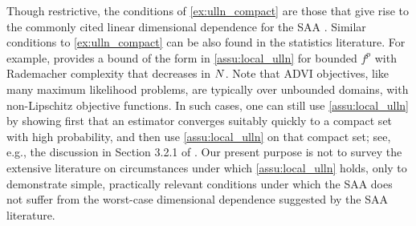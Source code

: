 %
Though restrictive, the conditions of \cref{ex:ulln_compact} are those that give
rise to the commonly cited linear dimensional dependence for the SAA
\citep[e.g.][]{nemirovski:2009:sgdvsfixed, kim:2015:guidetosaa,
homem:2014:montecarlosaa}. Similar conditions to \cref{ex:ulln_compact} can be
also found in the statistics literature.  For example, \citet[Theorem
4.10]{wainwright:2019:high} provides a bound of the form in
\cref{assu:local_ulln} for bounded $f^p$ with Rademacher complexity that
decreases in $N$.
%
Note that ADVI objectives, like many maximum likelihood problems, are typically
over unbounded domains, with non-Lipschitz objective functions.  In such cases,
one can still use \cref{assu:local_ulln} by showing first that an estimator
converges suitably quickly to a compact set with high probability, and then use
\cref{assu:local_ulln} on that compact set; see, e.g., the discussion in Section
3.2.1 of \citet{wellner:2013:empiricalprocesses}.
%
Our present purpose is not to survey the extensive literature on circumstances
under which \cref{assu:local_ulln} holds, only to demonstrate simple,
practically relevant conditions under which the SAA does not suffer from the
worst-case dimensional dependence suggested by the SAA literature.




